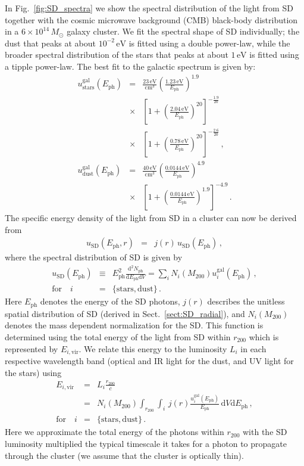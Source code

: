 \documentclass[10pt,aps,pra,reprint,amsmath,amsfonts,amssymb,showpacs,nofootinbib,floatfix]{revtex4-1}
\newcommand{\rmn}{\mathrm}
\newcommand{\ph}{\rmn{ph}}
\newcommand{\eph}{E_\ph}
\newcommand{\vir}{\rmn{vir}}
\newcommand{\gal}{\rmn{gal}}
\newcommand{\sd}{\rmn{SD}}
\newcommand{\msun}{M_\odot}
\newcommand{\stars}{\rmn{stars}}
\newcommand{\dust}{\rmn{dust}}
\newcommand{\ev}{\rmn{eV}}
\newcommand{\dd}{\rmn{d}}
\newcommand{\rvir}{r_{200}}
\newcommand{\mvir}{M_{200}}
\begin{document}
In Fig.~\ref{fig:SD_spectra} we show the spectral distribution of the
light from SD together with the cosmic microwave background (CMB)
black-body distribution in a $6\times10^{14}\,\msun$ galaxy
cluster. We fit the spectral shape of SD individually; the dust that
peaks at about $10^{-2}\,\ev$ is fitted using a double power-law,
while the broader spectral distribution of the stars that peaks at
about $1\,\ev$ is fitted using a tipple power-law. The best fit to the
galactic spectrum is given by:
\begin{eqnarray}
  u_\stars^\gal(\eph) &=& \frac{23\,\rmn{eV}}{\rmn{cm}^3} 
  \left(\frac{1.23\,\rmn{eV}}{\eph}\right)^{1.9} \nonumber \\
  &\times&\left[1+\left(\frac{2.04\,\rmn{eV}}{\eph}\right)^{20}\right]
  ^{-\frac{1.9}{20}}\nonumber \\
  &\times& \left[1+\left(\frac{0.78\,\rmn{eV}}{\eph}\right)^{20}\right]^{-\frac{2.6}{20}}\,, \\
  u_\dust^\gal(\eph) &=& 
  \frac{40\,\rmn{eV}}{\rmn{cm}^3} 
  \left(\frac{0.0144\,\rmn{eV}}{\eph}\right)^{4.9}\nonumber \\
  &\times& \left[1+\left(\frac{0.0144\,\rmn{eV}}{\eph}\right)^{1.9}\right]^{-4.9}\,.
\end{eqnarray}
The specific energy density of the light from SD in a cluster can now
be derived from
\begin{eqnarray} 
u_\sd(\eph, r) &=& j(r)\,u_\sd(\eph)\,,
\label{eq:u_SD_er}
\end{eqnarray}
where the spectral distribution of SD is given by
\begin{eqnarray}
  u_\sd(\eph) &\equiv& \eph^2\frac{\dd^2 N_\ph}{\dd \eph \dd V}
  =  \sum_i N_i(\mvir) u_i^\gal(\eph)\,,\nonumber \\ 
\rmn{for}\quad i&=&\{\rmn{stars,dust}\}\,.
\end{eqnarray}
Here $\eph$ denotes the energy of the SD photons, $j(r)$ describes the
unitless spatial distribution of SD (derived in
Sect.~\ref{sect:SD_radial}), and $N_i(\mvir)$ denotes the mass
dependent normalization for the SD. This function is determined using
the total energy of the light from SD within $\rvir$ which is
represented by $E_{i,\vir}$. We relate this energy to the luminosity
$L_i$ in each respective wavelength band (optical and IR light for the
dust, and UV light for the stars) using
\begin{eqnarray} 
  E_{i,\vir} &=& L_i \frac{\rvir}{c} \nonumber \\
  &=&N_i(\mvir)\int_{\rvir} \int_i \,j(r) 
  \frac{u_i^\gal(\eph)}{\eph}\,\dd V\dd \eph\,,\nonumber \\
 \rmn{for}\quad i&=&\{\rmn{stars,dust}\}\,.
\label{eq:E_SD}
\end{eqnarray}
Here we approximate the total energy of the photons within $\rvir$
with the SD luminosity multiplied the typical timescale it takes for a
photon to propagate through the cluster (we assume that the cluster is
optically thin).
\end{document}
